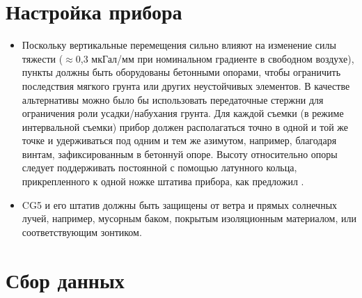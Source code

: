 \section[Настройка прибора]{Настройка прибора}
\label{sec:setting_up_the_instrument}

\begin{itemize}
    \item Поскольку вертикальные перемещения сильно влияют на изменение силы
    тяжести ($\approx$0,3 мкГал/мм при номинальном градиенте в свободном
    воздухе), пункты должны быть оборудованы бетонными опорами, чтобы ограничить
    последствия мягкого грунта или других неустойчивых элементов. В качестве
    альтернативы можно было бы использовать передаточные стержни для ограничения
    роли усадки/набухания грунта. Для каждой съемки (в режиме интервальной 
    съемки) прибор должен располагаться точно в одной и той же точке и
    удерживаться под одним и тем же азимутом, например, благодаря винтам,
    зафиксированным в бетоннуй опоре. Высоту относительно опоры следует
    поддерживать постоянной с помощью латунного кольца, прикрепленного к одной
    ножке штатива прибора, как предложил \cite{montgomery_1971}.
    
    \item CG5 и его штатив должны быть защищены от ветра и прямых солнечных
    лучей, например, мусорным баком, покрытым изоляционным материалом, или
    соответствующим зонтиком.
    
\end{itemize}

\section[Сбор данных]{Сбор данных}
\label{sec:data_acquisition}

